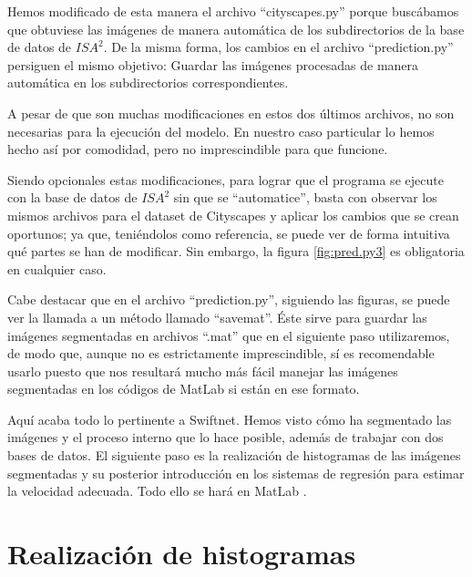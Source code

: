 \begin{itemize}
Hemos modificado de esta manera el archivo ``cityscapes.py'' porque buscábamos que obtuviese las imágenes de manera automática de los subdirectorios de la base de datos de $ISA^{2}$. De la misma forma, los cambios en el archivo ``prediction.py'' persiguen el mismo objetivo: Guardar las imágenes procesadas de manera automática en los subdirectorios correspondientes.

A pesar de que son muchas modificaciones en estos dos últimos archivos, no son necesarias para la ejecución del modelo. En nuestro caso particular lo hemos hecho así por comodidad, pero no imprescindible para que funcione.

Siendo opcionales estas modificaciones, para lograr que el programa se ejecute con la base de datos de $ISA^{2}$ sin que se ``automatice'', basta con observar los mismos archivos para el dataset de Cityscapes y aplicar los cambios que se crean oportunos; ya que, teniéndolos como referencia, se puede ver de forma intuitiva qué partes se han de modificar. Sin embargo, la figura \ref{fig:pred.py3} es obligatoria en cualquier caso.

Cabe destacar que en el archivo ``prediction.py'', siguiendo las figuras, se puede ver la llamada a un método llamado ``savemat''. Éste sirve para guardar las imágenes segmentadas en archivos ``.mat'' que en el siguiente paso utilizaremos, de modo que, aunque no es estrictamente imprescindible, sí es recomendable usarlo puesto que nos resultará mucho más fácil manejar las imágenes segmentadas en los códigos de MatLab \cite{matlab} si están en ese formato.

\end{itemize}

Aquí acaba todo lo pertinente a Swiftnet. Hemos visto cómo ha segmentado las imágenes y el proceso interno que lo hace posible, además de trabajar con dos bases de datos. El siguiente paso es la realización de histogramas de las imágenes segmentadas y su posterior introducción en los sistemas de regresión para estimar la velocidad adecuada. Todo ello se hará en MatLab \cite{matlab}.

\section{Realización de histogramas}

